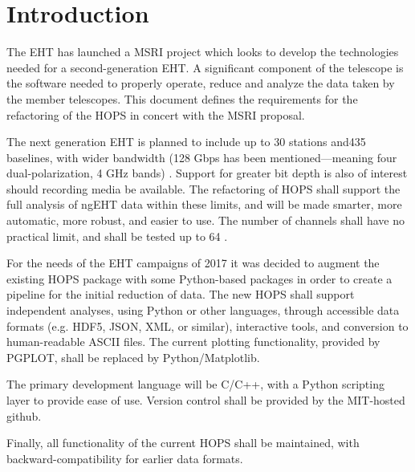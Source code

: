 %
%

\section{Introduction}
\label{sec:intro}

The \ac{EHT} has launched a \ac{MSRI} project which looks to develop
the technologies needed for a second-generation \acs{EHT}. 
A significant component of the telescope is the software needed to 
properly operate, reduce and analyze the data taken by the member telescopes.
This document defines the requirements for the refactoring of the \ac{HOPS} in 
concert with the \acs{MSRI} proposal. 

The next generation \acs{EHT} is planned to include up to \TBR{} 30 stations
and435 baselines, with wider bandwidth (128 Gbps has been mentioned---meaning
four dual-polarization, 4 GHz bands) \TBR{}. Support for greater bit depth is
also of interest should recording media be available.  The refactoring
of \ac{HOPS} shall support the full analysis of ngEHT data within these limits,
and will be made smarter, more automatic, more robust, and easier to use. The
number of channels shall have no practical limit, and shall be tested up to 64 \TBR{}.


For the needs of the \acs{EHT} campaigns of 2017 it was decided to augment
the existing HOPS package with some Python-based packages in order to
create a pipeline for the initial reduction of data. The new \ac{HOPS} shall
support independent analyses, using Python or other languages, through
accessible data formats (e.g. HDF5, JSON, XML, or similar), interactive tools,
and conversion to human-readable ASCII files. The current plotting functionality,
provided by PGPLOT, shall be replaced by Python/Matplotlib.


The primary development language will be C/C++, with a Python scripting layer
to provide ease of use. Version control shall be provided by the MIT-hosted
github.

Finally, all functionality of the current \acs{HOPS} shall be maintained, with
backward-compatibility for earlier data formats.  

